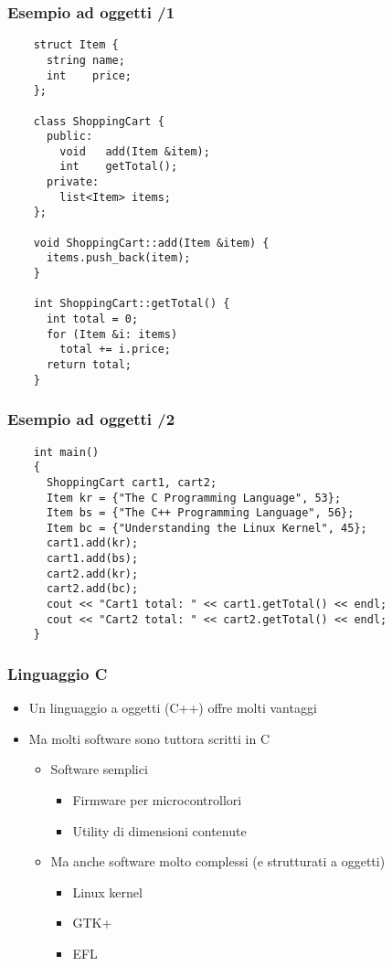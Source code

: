 \documentclass[xetex,table]{beamer}
\begin{document}
\begin{frame}[fragile]
  \frametitle{Esempio ad oggetti /1}
  \begin{verbatim}
    struct Item {
      string name;
      int    price;
    };

    class ShoppingCart {
      public:
        void   add(Item &item);
        int    getTotal();
      private:
        list<Item> items;
    };

    void ShoppingCart::add(Item &item) {
      items.push_back(item);
    }

    int ShoppingCart::getTotal() {
      int total = 0;
      for (Item &i: items)
        total += i.price;
      return total;
    }
  \end{verbatim}
\end{frame}

\begin{frame}[fragile]
  \frametitle{Esempio ad oggetti /2}
  \begin{verbatim}
    int main()
    {
      ShoppingCart cart1, cart2;
      Item kr = {"The C Programming Language", 53};
      Item bs = {"The C++ Programming Language", 56};
      Item bc = {"Understanding the Linux Kernel", 45};
      cart1.add(kr);
      cart1.add(bs);
      cart2.add(kr);
      cart2.add(bc);
      cout << "Cart1 total: " << cart1.getTotal() << endl;
      cout << "Cart2 total: " << cart2.getTotal() << endl;
    }
  \end{verbatim}
\end{frame}

\begin{frame}
  \frametitle{Linguaggio C}
  \begin{itemize}
  \item Un linguaggio a oggetti (C++) offre molti vantaggi
  \item Ma molti software sono tuttora scritti in C
    \begin{itemize}
    \item Software semplici
      \begin{itemize}
      \item Firmware per microcontrollori
      \item Utility di dimensioni contenute
      \end{itemize}
    \item Ma anche software molto complessi (e strutturati a oggetti)
      \begin{itemize}
      \item Linux kernel
      \item GTK+
      \item EFL
      \end{itemize}
    \end{itemize}
  \end{itemize}
\end{frame}
\end{document}
